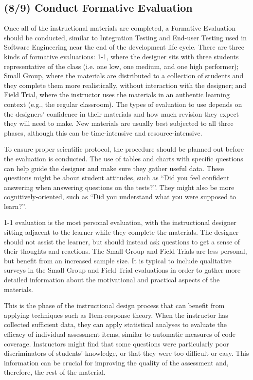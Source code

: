 \subsection{(8/9) Conduct Formative Evaluation}

Once all of the instructional materials are completed, a Formative Evaluation should be conducted, similar to Integration Testing and End-user Testing used in Software Engineering near the end of the development life cycle.
There are three kinds of formative evaluations: 1-1, where the designer sits with three students representative of the class (i.e. one low, one medium, and one high performer); Small Group, where the materials are distributed to a collection of students and they complete them more realistically, without interaction with the designer; and Field Trial, where the instructor uses the materials in an authentic learning context (e.g., the regular classroom).
The types of evaluation to use depends on the designers' confidence in their materials and how much revision they expect they will need to make.
New materials are usually best subjected to all three phases, although this can be time-intensive and resource-intensive.

To ensure proper scientific protocol, the procedure should be planned out before the evaluation is conducted.
The use of tables and charts with specific questions can help guide the designer and make sure they gather useful data.
These questions might be about student attitudes, such as ``Did you feel confident answering when answering questions on the tests?''.
They might also be more cognitively-oriented, such as ``Did you understand what you were supposed to learn?''.

1-1 evaluation is the most personal evaluation, with the instructional designer sitting adjacent to the learner while they complete the materials.
The designer should not assist the learner, but should instead ask questions to get a sense of their thoughts and reactions.
The Small Group and Field Trials are less personal, but benefit from an increased sample size.
It is typical to include qualitative surveys in the Small Group and Field Trial evaluations in order to gather more detailed information about the motivational and practical aspects of the materials.

This is the phase of the instructional design process that can benefit from applying techniques such as Item-response theory.
When the instructor has collected sufficient data, they can apply statistical analyses to evaluate the efficacy of individual assessment items, similar to automatic measures of code coverage. 
Instructors might find that some questions were particularly poor discriminators of students' knowledge, or that they were too difficult or easy.
This information can be crucial for improving the quality of the assessment and, therefore, the rest of the material.

